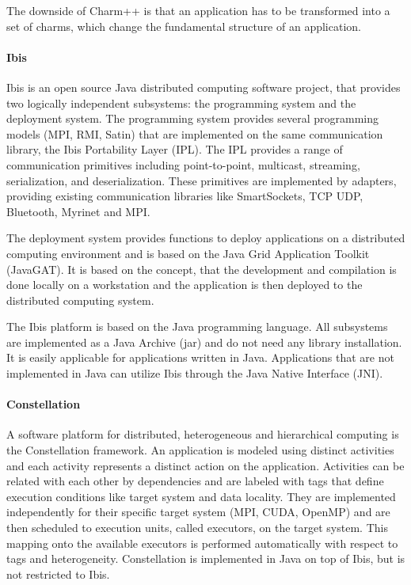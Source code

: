 The downside of Charm++ is that an application has to be transformed
into a set of charms, which change the fundamental structure of an
application.

\paragraph*{Ibis} 
Ibis \cite{ref:ibis} is an open source Java distributed computing
software project, that provides two logically independent subsystems:
the programming system and the deployment system. The programming
system provides several programming models (MPI, RMI, Satin) that are
implemented on the same communication library, the Ibis Portability
Layer (IPL).  The IPL provides a range of communication primitives
including point-to-point, multicast, streaming, serialization, and
deserialization. These primitives are implemented by adapters,
providing existing communication libraries like SmartSockets, TCP UDP,
Bluetooth, Myrinet and MPI.

The deployment system provides functions to deploy applications on a
distributed computing environment and is based on the Java Grid
Application Toolkit (JavaGAT).  It is based on the concept, that the
development and compilation is done locally on a workstation and the
application is then deployed to the distributed computing system.

The Ibis platform is based on the Java programming language. All subsystems are implemented as
a Java Archive (jar) and do not need any library installation. It is easily
applicable for applications written in Java. Applications that are not implemented in Java 
can utilize Ibis through the Java Native Interface (JNI).

\paragraph*{Constellation}
A software platform for distributed, heterogeneous and hierarchical
computing is the Constellation \cite{ref:constellation} framework. An
application is modeled using distinct activities and each activity
represents a distinct action on the application.  Activities can be
related with each other by dependencies and are labeled with tags that
define execution conditions like target system and data locality.
They are implemented independently for their specific target system
(MPI, CUDA, OpenMP) and are then scheduled to execution units, called
executors, on the target system. This mapping onto the available
executors is performed automatically with respect to tags and
heterogeneity. Constellation is implemented in Java on top of Ibis,
but is not restricted to Ibis.

